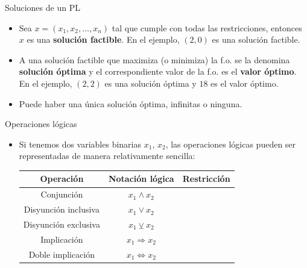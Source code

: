 \documentclass[10pt, aspectratio=169]{beamer}
\begin{document}
\begin{frame}{Soluciones de un PL}
    \begin{itemize}
        \item Sea $x=(x_1, x_2, \dots, x_n)$ tal que cumple con todas las restricciones, entonces $x$ es una \textbf{solución factible}. En el ejemplo, $(2,0)$ es una solución factible.
        \item A una solución factible que maximiza (o minimiza) la f.o. se la denomina \textbf{solución óptima} y el correspondiente valor de la f.o. es el \textbf{valor óptimo}. En el ejemplo, $(2,2)$ es una solución óptima y $18$ es el valor óptimo.
        \item Puede haber una única solución óptima, infinitas o ninguna.
    \end{itemize}
\end{frame}

\begin{frame}{Operaciones l\'ogicas}
    \begin{itemize}
        \item Si tenemos dos variables binarias $x_1,\,x_2$, las operaciones l\'ogicas pueden ser representadas de manera relativamente sencilla:
        \begin{table}[]
            \centering
            \begin{tabular}{ccc}\toprule
                Operaci\'on & Notaci\'on l\'ogica & Restricci\'on  \\ \midrule
                Conjunci\'on & $x_1 \land x_2$ &  \\
                Disyunci\'on inclusiva & $x_1 \lor x_2$ & \\
                Disyunci\'on exclusiva & $x_1 \veebar x_2$ &  \\
                Implicaci\'on & $x_1 \Rightarrow x_2$ &  \\
                Doble implicaci\'on & $x_1 \Leftrightarrow x_2$  &
            \end{tabular}
        \end{table}
    \end{itemize}
\end{frame}
\end{document}
